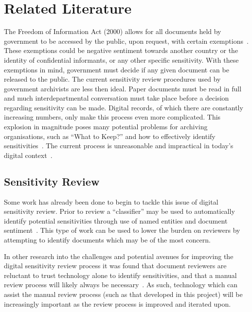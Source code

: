 \documentclass{l4proj}
\begin{document}
\chapter{Related Literature} \label{relatedliterature}
The Freedom of Information Act (2000) allows for all documents held by government to be accessed by the public, upon request, with certain exemptions~\cite{foi}. These exemptions could be negative sentiment towards another country or the identity of confidential informants, or any other specific sensitivity. With these exemptions in mind, government must decide if any given document can be released to the public.
The current sensitivity review procedures used by government archivists are less then ideal. Paper documents must be read in full and much interdepartmental conversation must take place before a decision regarding sensitivity can be made. Digital records, of which there are constantly increasing numbers, only make this process even more complicated. This explosion in magnitude poses many potential problems for archiving organisations, such as ``What to Keep?'' and how to effectively identify sensitivities~\cite{moss2012have}. The current process is unreasonable and impractical in today's digital context~\cite{allan2014record}.

\section{Sensitivity Review}
Some work has already been done to begin to tackle this issue of digital sensitivity review. Prior to review a ``classifier'' may be used to automatically identify potential sensitivities through use of named entities and document sentiment~\cite{mcdonald2014towards}. This type of work can be used to lower the burden on reviewers by attempting to identify documents which may be of the most concern.

In other research into the challenges and potential avenues for improving the digital sensitivity review process it was found that document reviewers are reluctant to trust technology alone to identify sensitivities, and that a manual review process will likely always be necessary~\cite{gollins2014using}. 
As such, technology which can assist the manual review process (such as that developed in this project) will be increasingly important as the review process is improved and iterated upon.
\end{document}
